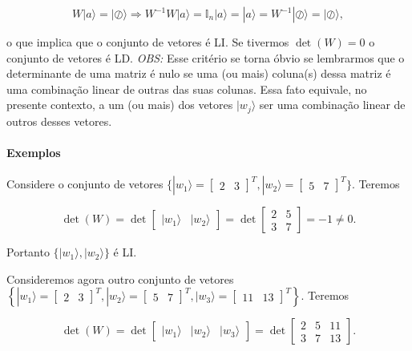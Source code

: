 \documentclass[11pt]{article}
\begin{document}
\begin{equation}
W|a\rangle=|\oslash\rangle\Rightarrow W^{-1}W|a\rangle=\mathbb{I}_{n}|a\rangle=|a\rangle=W^{-1}|\oslash\rangle=|\oslash\rangle,
\end{equation}

o que implica que o conjunto de vetores é LI. Se tivermos \(\det(W)=0\)
o conjunto de vetores é LD. \emph{OBS:} Esse critério se torna óbvio se
lembrarmos que o determinante de uma matriz é nulo se uma (ou mais)
coluna(s) dessa matriz é uma combinação linear de outras das suas
colunas. Essa fato equivale, no presente contexto, a um (ou mais) dos
vetores \(|w_{j}\rangle\) ser uma combinação linear de outros desses
vetores.

    \paragraph{Exemplos}\label{exemplos}

Considere o conjunto de vetores
\(\{|w_{1}\rangle=\begin{bmatrix} 2 & 3 \end{bmatrix}^{T},|w_{2}\rangle=\begin{bmatrix} 5 & 7 \end{bmatrix}^{T}\}\).
Teremos

\begin{equation}
\det(W)=\det\begin{bmatrix} |w_{1}\rangle & |w_{2}\rangle \end{bmatrix}=\det\begin{bmatrix} 2 & 5 \\ 3 & 7 \end{bmatrix} = -1 \ne 0.
\end{equation}

Portanto \(\{|w_{1}\rangle,|w_{2}\rangle\}\) é LI.

Consideremos agora outro conjunto de vetores
\(\left\{|w_{1}\rangle=\begin{bmatrix} 2 & 3 \end{bmatrix}^{T},|w_{2}\rangle=\begin{bmatrix} 5 & 7 \end{bmatrix}^{T},|w_{3}\rangle=\begin{bmatrix} 11 & 13 \end{bmatrix}^{T}\right\}\).
Teremos

\begin{equation}
\det(W)=\det\begin{bmatrix} |w_{1}\rangle & |w_{2}\rangle & |w_{3}\rangle\end{bmatrix}=\det\begin{bmatrix} 2 & 5 & 11 \\ 3 & 7 & 13 \end{bmatrix}.
\end{equation}
\end{document}
